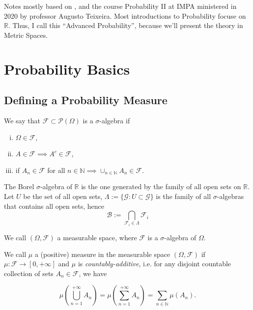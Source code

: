 Notes mostly based on \citet{impaproba}, \citet{sokol2013advanced}
and the course Probability II at IMPA ministered in 2020 by professor
Augusto Teixeira.
Most introductions to Probability focuse on $\mathbb R$. Thus,
I call this ``Advanced Probability'', because we'll present
the theory in Metric Spaces.

\section{Probability Basics}

\subsection{Defining a Probability Measure}

\begin{definition}
	We say that $\mathcal F \subset \mathcal P(\Omega)$ is a $\sigma$-algebra
	if
	\begin{enumerate}[(i)]
		\item $\Omega \in \mathcal F$,
		\item $A \in \mathcal F \implies A^c \in \mathcal F$,
		\item if $A_n \in \mathcal F$ for all $n \in \mathbb N \implies
			      \cup_{n\in \mathbb N} A_n \in \mathcal F$.
	\end{enumerate}
\end{definition}

\begin{definition}
	The Borel $\sigma$-algebra of $\mathbb R$ is the one generated by the family of all open sets
	on $\mathbb R$. Let $U$ be the set of all open sets, $\Lambda := \{\mathcal G : U \subset \mathcal G\}$ is
	the family of all $\sigma$-algebras that contains all open sets, hence
	\begin{equation}
		\mathcal B := \bigcap_{\mathcal F_i \in \Lambda} \mathcal F_i
	\end{equation}
\end{definition}

\begin{definition}
	We call $(\Omega, \mathcal F)$ a measurable space, where $\mathcal F$ is a $\sigma$-algebra of $\Omega$.
\end{definition}

\begin{definition}[Measure]
	We call $\mu$ a (positive) measure in the measurable space $(\Omega, \mathcal F)$
	if $\mu: \mathcal F \to [0,+\infty]$ and $\mu$ is \textit{countably-additive}, i.e.
	for any disjoint countable collection of sets $A_n \in \mathcal F$, we have

	\begin{equation}
		\mu\left(\bigcup_{n=1}^{+\infty}A_n\right)=
		\mu\left(\sum_{n=1}^{+\infty}A_n\right) = \sum_{n\in \mathbb N} \mu(A_n).
	\end{equation}
\end{definition}

